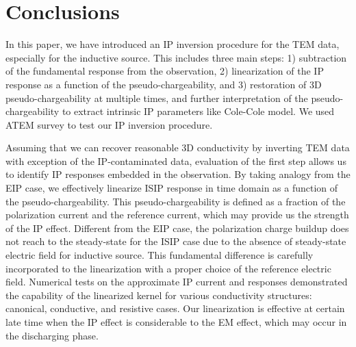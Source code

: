 \documentclass[extra,mreferee]{gji}
\begin{document}
\section{Conclusions}
In this paper, we have introduced an IP inversion procedure for the TEM data, especially for the inductive source. 
This includes three main steps: 1) subtraction of the fundamental response from the observation, 2) linearization of the IP response as a function of the pseudo-chargeability, and 3) restoration of 3D pseudo-chargeability at multiple times, and further interpretation of the pseudo-chargeability to extract intrinsic IP parameters like Cole-Cole model. We used ATEM survey to test our IP inversion procedure.

Assuming that we can recover reasonable 3D conductivity by inverting TEM data with exception of the IP-contaminated data, evaluation of the first step allows us to identify IP responses embedded in the observation. 
By taking analogy from the EIP case, we effectively linearize ISIP response in time domain as a function of the pseudo-chargeability. 
This pseudo-chargeability is defined as a fraction of the polarization current and the reference current, which may provide us the strength of the IP effect. 
Different from the EIP case, the polarization charge buildup does not reach to the steady-state for the ISIP case due to the absence of steady-state electric field for inductive source. 
This fundamental difference is carefully incorporated to the linearization with a proper choice of the reference electric field. 
Numerical tests on the approximate IP current and responses demonstrated the capability of the linearized kernel for various conductivity structures: canonical, conductive, and resistive cases. 
Our linearization is effective at certain late time when the IP effect is considerable to the EM effect, which may occur in the discharging phase. 
\end{document}

